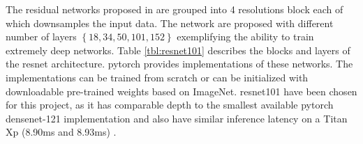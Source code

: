 The residual networks proposed in \cite{he_deep_2015} are grouped into 4 resolutions block each of which downsamples the input data. The network are proposed with different number of layers $ \left\{18, 34, 50, 101, 152\right\} $ exemplifying the ability to train extremely deep networks. Table \ref{tbl:resnet101} describes the blocks and layers of the \gls{resnet} architecture. \gls{pytorch} provides implementations of these networks. The implementations can be trained from scratch or can be initialized with downloadable pre-trained weights based on ImageNet. \gls{resnet}101 have been chosen for this project, as it has comparable depth to the smallest available \gls{pytorch} \gls{densenet}-121 implementation and also have similar inference latency on a Titan Xp (8.90ms and 8.93ms) \cite{bianco_benchmark_2018}.

\small
